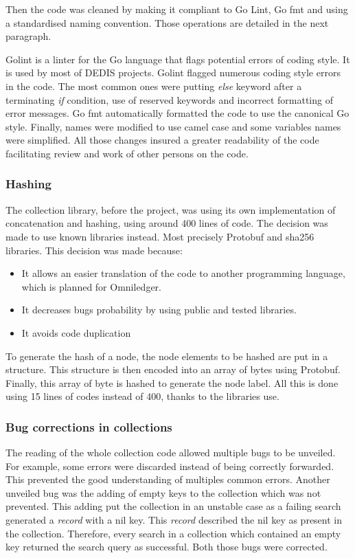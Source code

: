 \documentclass[11pt, a4paper, twoside, openright]{article}
\begin{document}
Then the code was cleaned by making it compliant to Go Lint\cite{Golint}, Go fmt\cite{gofmt} and using a standardised naming convention. Those operations are detailed in the next paragraph.

Golint is a linter for the Go language that flags potential errors of coding style. It is used by most of DEDIS projects. Golint flagged numerous coding style errors in the code. The most common ones were putting \textit{else} keyword after a terminating \textit{if} condition, use of reserved keywords and incorrect formatting of error messages. Go fmt automatically formatted the code to use the canonical Go style. Finally, names were modified to use camel case and some variables names were simplified. All those changes insured a greater readability of the code facilitating review and work of other persons on the code.

\subsubsection{Hashing}
The collection library, before the project, was using its own implementation of concatenation and hashing, using around 400 lines of code. The decision was made to use known libraries instead. Most precisely Protobuf \cite{protobuf} and sha256 libraries. This decision was made because:
\begin{itemize}
\itemsep0em
\item It allows an easier translation of the code to another programming language, which is planned for Omniledger.
\item It decreases bugs probability by using public and tested libraries.
\item It avoids code duplication
\end{itemize}
To generate the hash of a node, the node elements to be hashed are put in a structure. This structure is then encoded into an array of bytes using Protobuf. Finally, this array of byte is hashed to generate the node label. All this is done using 15 lines of codes instead of 400, thanks to the libraries use.

\subsubsection{Bug corrections in collections}
The reading of the whole collection code allowed multiple bugs to be unveiled. For example, some errors were discarded instead of being correctly forwarded. This prevented the good understanding of multiples common errors. Another unveiled bug was the adding of empty keys to the collection which was not prevented. This adding put the collection in an unstable case as a failing search generated a \textit{record} with a nil key. This \textit{record} described the nil key as present in the collection. Therefore, every search in a collection which contained an empty key returned the search query as successful. Both those bugs were corrected.
\end{document}
